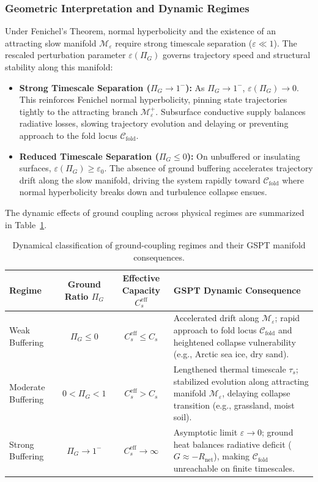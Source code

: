 \documentclass[11pt]{article}
\begin{document}
\subsubsection{Geometric Interpretation and Dynamic Regimes}
Under Fenichel's Theorem, normal hyperbolicity and the existence of an attracting slow manifold $\mathcal{M}_\varepsilon$ require strong timescale separation ($\varepsilon \ll 1$). The rescaled perturbation parameter $\varepsilon(\Pi_G)$ governs trajectory speed and structural stability along this manifold:
\begin{itemize}
	\item \textbf{Strong Timescale Separation ($\Pi_G \to 1^-$):} As $\Pi_G \to 1^-$, $\varepsilon(\Pi_G) \to 0$. This reinforces Fenichel normal hyperbolicity, pinning state trajectories tightly to the attracting branch $\mathcal{M}_\varepsilon^+$. Subsurface conductive supply balances radiative losses, slowing trajectory evolution and delaying or preventing approach to the fold locus $\mathcal{C}_{\text{fold}}$.
	\item \textbf{Reduced Timescale Separation ($\Pi_G \le 0$):} On unbuffered or insulating surfaces, $\varepsilon(\Pi_G) \ge \varepsilon_0$. The absence of ground buffering accelerates trajectory drift along the slow manifold, driving the system rapidly toward $\mathcal{C}_{\text{fold}}$ where normal hyperbolicity breaks down and turbulence collapse ensues.
\end{itemize}

The dynamic effects of ground coupling across physical regimes are summarized in Table~\ref{tab:ground_coupling_regimes}.

\begin{table}[htbp]
\centering
\small
\caption{Dynamical classification of ground-coupling regimes and their GSPT manifold consequences.}
\label{tab:ground_coupling_regimes}
\begin{tabular}{l c c p{5.0cm}}
\toprule
\textbf{Regime} & \textbf{Ground Ratio $\Pi_G$} & \textbf{Effective Capacity $C_s^{\text{eff}}$} & \textbf{GSPT Dynamic Consequence} \\
\midrule
Weak Buffering & $\Pi_G \le 0$ & $C_s^{\text{eff}} \le C_s$ & Accelerated drift along $\mathcal{M}_\varepsilon$; rapid approach to fold locus $\mathcal{C}_{\text{fold}}$ and heightened collapse vulnerability (e.g., Arctic sea ice, dry sand). \\
\addlinespace
Moderate Buffering & $0 < \Pi_G < 1$ & $C_s^{\text{eff}} > C_s$ & Lengthened thermal timescale $\tau_s$; stabilized evolution along attracting manifold $\mathcal{M}_\varepsilon$, delaying collapse transition (e.g., grassland, moist soil). \\
\addlinespace
Strong Buffering & $\Pi_G \to 1^-$ & $C_s^{\text{eff}} \to \infty$ & Asymptotic limit $\varepsilon \to 0$; ground heat balances radiative deficit ($G \approx -R_{\text{net}}$), making $\mathcal{C}_{\text{fold}}$ unreachable on finite timescales. \\
\bottomrule
\end{tabular}
\end{table}
\end{document}
